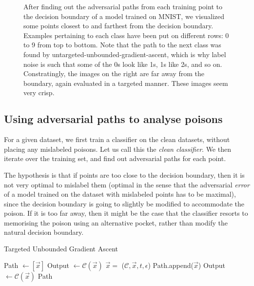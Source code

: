 \documentclass[12pt, oneside]{book}
\begin{document}
\begin{figure}
    \caption{After finding out the adversarial paths from each training point to
    the decision boundary of a model trained on MNIST, we visualized some points
    closest to and farthest from the decision boundary. Examples pertaining to
    each class have been put on different rows: 0 to 9 from top to bottom. Note
    that the path to the next class was found by
    untargeted-unbounded-gradient-ascent, which is why label noise is such that
    some of the 0s look like 1s, 1s like 2s, and so on. Constratingly, the
    images on the right are far away from the boundary, again evaluated in a
    targeted manner. These images seem very crisp.}
    \label{fig:pgd-path-examples}
\end{figure}


\subsection{Using adversarial paths to analyse poisons}

For a given dataset, we first train a classifier on the clean datasets, without
placing any mislabeled poisons. Let us call this the \emph{clean classifier}. We
then iterate over the training set, and find out adversarial paths for each
point.

The hypothesis is that if points are too close to the decision boundary, then it
is not very optimal to mislabel them (optimal in the sense that the adversarial
\emph{error} of a model trained on the dataset with mislabeled points has to be
maximal), since the decision boundary is going to slightly be modified to
accommodate the poison. If it is too far away, then it might be the case that
the classifier resorts to memorising the poison using an alternative pocket,
rather than modify the natural decision boundary.

\begin{algorithm}[!h]
\caption{Targeted Unbounded Gradient Ascent}
\begin{algorithmic}[1]
    \State Path $\gets [\vec{x}]$
    \State Output $\gets \mathcal{C}(\vec{x})$
        \State $\vec{x} =$ ($\mathcal{C}, \vec{x}, t, \epsilon$)
        \State Path.append($\vec{x}$)
        \State Output $\gets \mathcal{C}(\vec{x})$
    \EndWhile
    \State \Return Path
    \label{algorithm:unbounded-gd}
\EndProcedure

\end{algorithmic}
\end{algorithm}
\end{document}
